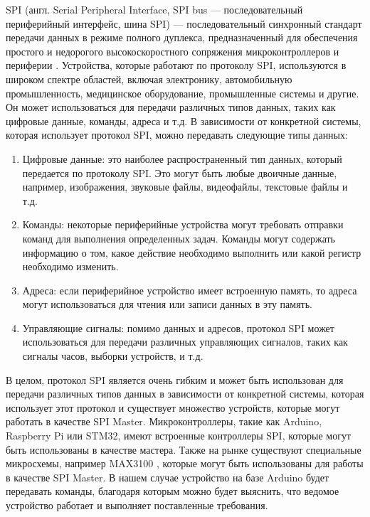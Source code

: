 \documentclass[14pt, oneside]{altsu-report}
\begin{document}
	SPI (англ. Serial Peripheral Interface, SPI bus — последовательный периферийный интерфейс, шина SPI) — последовательный синхронный стандарт передачи данных в режиме полного дуплекса, предназначенный для обеспечения простого и недорогого высокоскоростного сопряжения микроконтроллеров и периферии \cite{spi}. Устройства, которые работают по протоколу SPI, используются в широком спектре областей, включая электронику, автомобильную промышленность, медицинское оборудование, промышленные системы и другие. Он может использоваться для передачи различных типов данных, таких как цифровые данные, команды, адреса и т.д. В зависимости от конкретной системы, которая использует протокол SPI, можно передавать следующие типы данных:
	\begin{enumerate}
		\item Цифровые данные: это наиболее распространенный тип данных, который передается по протоколу SPI. Это могут быть любые двоичные данные, например, изображения, звуковые файлы, видеофайлы, текстовые файлы и т.д.
		\item Команды: некоторые периферийные устройства могут требовать отправки команд для выполнения определенных задач. Команды могут содержать информацию о том, какое действие необходимо выполнить или какой регистр необходимо изменить.
		\item Адреса: если периферийное устройство имеет встроенную память, то адреса могут использоваться для чтения или записи данных в эту память.
		\item Управляющие сигналы: помимо данных и адресов, протокол SPI может использоваться для передачи различных управляющих сигналов, таких как сигналы часов, выборки устройств, и т.д.
	\end{enumerate}	 
	
	В целом, протокол SPI является очень гибким и может быть использован для передачи различных типов данных в зависимости от конкретной системы, которая использует этот протокол и существует множество устройств, которые могут работать в качестве SPI Master. Микроконтроллеры, такие как Arduino, Raspberry Pi или STM32, имеют встроенные контроллеры SPI, которые могут быть использованы в качестве мастера. Также на рынке существуют специальные микросхемы, например MAX3100 \cite{max3100}, которые могут быть использованы для работы в качестве SPI Master. В нашем случае устройство на базе Arduino будет передавать команды, благодаря которым можно будет выяснить, что ведомое устройство работает и выполняет поставленные требования.	
\end{document}
